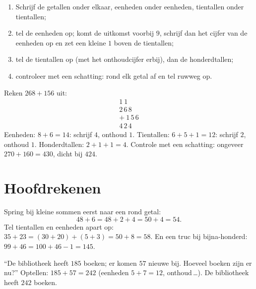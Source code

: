 \begin{method}\label{met:g2:addition:column}
\begin{enumerate}
  \item Schrijf de getallen onder elkaar, eenheden onder eenheden,
        tientallen onder tientallen;
  \item tel de eenheden op; komt de uitkomst voorbij $9$, schrijf dan
        het cijfer van de eenheden op en zet een kleine $1$ boven de
        tientallen;
  \item tel de tientallen op (met het onthoudcijfer erbij), dan de
        honderdtallen;
  \item controleer met een schatting: rond elk getal af en tel ruwweg
        op.
\end{enumerate}
\end{method}

\begin{example}\label{ex:g2:addition:worked}
Reken $268 + 156$ uit:
\[
\begin{array}{r}
{\scriptstyle 1}\ {\scriptstyle 1}\ \phantom{0} \\[-3pt]
2\,6\,8 \\
+\ 1\,5\,6 \\
\hline
4\,2\,4
\end{array}
\]
Eenheden: $8 + 6 = 14$: schrijf $4$, onthoud $1$. Tientallen:
$6 + 5 + 1 = 12$: schrijf $2$, onthoud $1$. Honderdtallen:
$2 + 1 + 1 = 4$. Controle met een schatting: ongeveer
$270 + 160 = 430$, dicht bij $424$. \checkmark
\end{example}

\section{Hoofdrekenen}

\begin{example}\label{ex:g2:addition:mental}
Spring bij kleine sommen eerst naar een rond getal:
\[
48 + 6 = 48 + 2 + 4 = 50 + 4 = 54 .
\]
Tel tientallen en eenheden apart op:
$35 + 23 = (30 + 20) + (5 + 3) = 50 + 8 = 58$. En een truc bij
bijna-honderd: $99 + 46 = 100 + 46 - 1 = 145$.
\end{example}

\begin{example}\label{ex:g2:addition:problem}
``De bibliotheek heeft $185$ boeken; er komen $57$ nieuwe bij. Hoeveel
boeken zijn er nu?'' Optellen: $185 + 57 = 242$ (eenheden
$5 + 7 = 12$, onthoud\,\dots). De bibliotheek heeft $242$ boeken.
\end{example}

